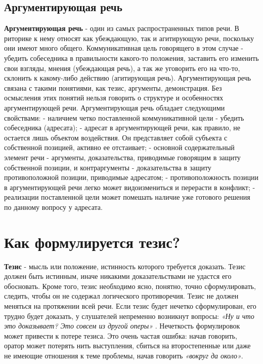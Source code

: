\section{Аргументирующая речь}  
\textbf{Аргументирующая речь} - один из самых распространенных типов речи. В риторике к нему относят как убеждающую, так и агитирующую речи, поскольку они имеют много общего. Коммуникативная цель говорящего в этом случае - убедить собеседника в правильности какого-то положения, заставить его изменить свои взгляды, мнения (убеждающая речь), а так же уговорить его на что-то, склонить к какому-либо действию (агитирующая речь). Аргументирующая речь связана с такими понятиями, как тезис, аргументы, демонстрация. Без осмысления этих понятий нельзя говорить о структуре и особенностях аргументирующей речи. Аргументирующая речь обладает следующими свойствами: 
	- наличием четко поставленной коммуникативной цели - убедить собеседника (адресата);
	- адресат в аргументирующей речи, как правило, не остается лишь объектом воздействия. Он представляет собой субъекта с собственной позицией, активно ее отстаивает;
	- основной содержательный элемент речи - аргументы, доказательства, приводимые говорящим в защиту собственной позиции, и контраргументы - доказательства в защиту противоположной позиции, приводимые адресатом;
	- противоположность позиции в аргументирующей речи легко может видоизмениться и перерасти в конфликт;
- реализации поставленной цели может помешать наличие уже готового решения по данному вопросу у адресата.

\chapter{Как формулируется тезис?}

\textbf{Тезис} - мысль или положение, истинность которого требуется доказать. Тезис должен быть истинным, иначе никакими доказательствами не удастся его обосновать. Кроме того, тезис необходимо ясно, понятно, точно сформулировать, следить, чтобы он не содержал логического противоречия. Тезис не должен меняться на протяжении всей речи. Если тезис будет нечетко сформулирован, его трудно будет доказать, у слушателей непременно возникнут вопросы: \textit{«Ну и что это доказывает? Это совсем из другой оперы»} . Нечеткость формулировок может привести к потере тезиса. Это очень частая ошибка: начав говорить, оратор может потерять нить выступления, сбиться на второстепенные или даже не имеющие отношения к теме проблемы, начав говорить \textit{«вокруг да около»}.
    
